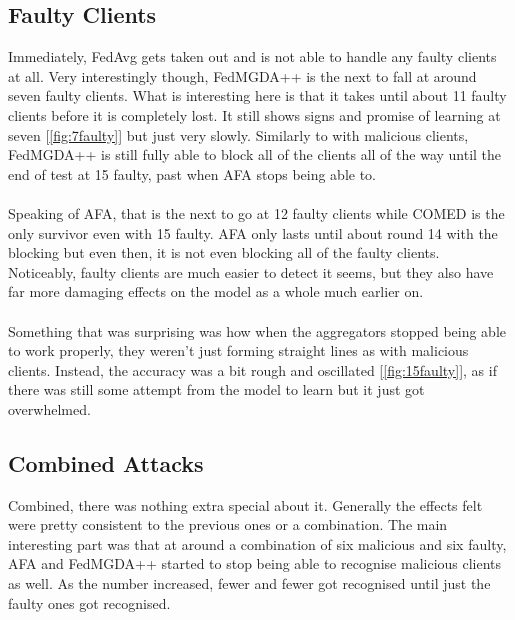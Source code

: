 \subsection{Faulty Clients}
Immediately, FedAvg gets taken out and is not able to handle any faulty clients at all.
Very interestingly though, FedMGDA++ is the next to fall at around seven faulty clients.
What is interesting here is that it takes until about 11 faulty clients before it is completely lost.
It still shows signs and promise of learning at seven [\ref{fig:7faulty}] but just very slowly.
Similarly to with malicious clients, FedMGDA++ is still fully able to block all of the clients all of the way until the end of test at 15 faulty, past when AFA stops being able to.
\\ \\
Speaking of AFA, that is the next to go at 12 faulty clients while COMED is the only survivor even with 15 faulty.
AFA only lasts until about round 14 with the blocking but even then, it is not even blocking all of the faulty clients.
Noticeably, faulty clients are much easier to detect it seems, but they also have far more damaging effects on the model as a whole much earlier on.
\\ \\
Something that was surprising was how when the aggregators stopped being able to work properly, they weren't just forming straight lines as with malicious clients.
Instead, the accuracy was a bit rough and oscillated [\ref{fig:15faulty}], as if there was still some attempt from the model to learn but it just got overwhelmed.


\subsection{Combined Attacks}
Combined, there was nothing extra special about it.
Generally the effects felt were pretty consistent to the previous ones or a combination.
The main interesting part was that at around a combination of six malicious and six faulty, AFA and FedMGDA++ started to stop being able to recognise malicious clients as well.
As the number increased, fewer and fewer got recognised until just the faulty ones got recognised.

